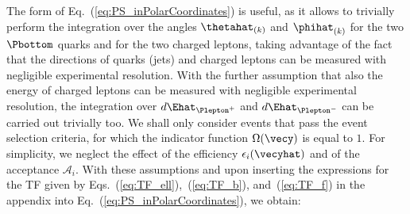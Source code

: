 The form of Eq.~(\ref{eq:PS_inPolarCoordinates}) is useful, 
as it allows to trivially perform the integration over the 
angles $\thetahat_{(k)}$ and $\phihat_{(k)}$ for the two $\Pbottom$ quarks and for the two charged leptons,
taking advantage of the fact that the directions of quarks (jets) and charged leptons can be measured with negligible experimental resolution.
With the further assumption that also the energy of charged leptons can be measured with negligible experimental resolution,
the integration over $d\Ehat_{\Plepton^{+}}$ and $d\Ehat_{\Plepton^{-}}$ can be carried out trivially too.
We shall only consider events that pass the event selection criteria, \ie for which the indicator function $\Omega(\vecy)$ is equal to $1$.
For simplicity, we neglect the effect of the efficiency $\epsilon_{i}(\vecyhat)$ and of the acceptance $\mathcal{A}_{i}$.
With these assumptions and upon inserting the expressions for the TF given by Eqs.~(\ref{eq:TF_ell}),~(\ref{eq:TF_b}), and~(\ref{eq:TF_f}) in the appendix
into Eq.~(\ref{eq:PS_inPolarCoordinates}), we obtain:
